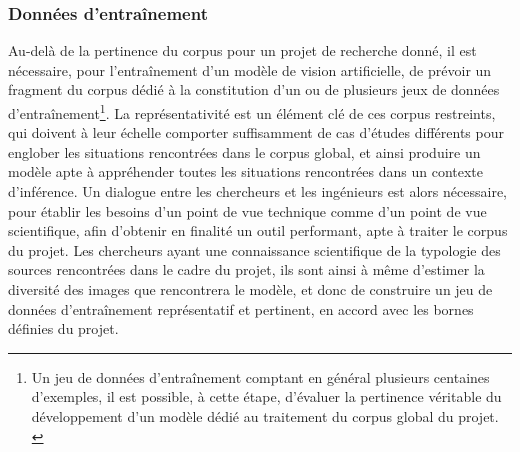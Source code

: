     \subsubsection{Données d'entraînement}
Au-delà de la pertinence du corpus pour un projet de recherche donné, il est nécessaire, pour l'entraînement d'un modèle de vision artificielle, de prévoir un fragment du corpus dédié à la constitution d'un ou de plusieurs jeux de données d'entraînement\footnote{Un jeu de données d'entraînement comptant en général plusieurs centaines d'exemples, il est possible, à cette étape, d'évaluer la pertinence véritable du développement d'un modèle dédié au traitement du corpus global du projet. \cite{strienComputerVisionHumanities2022}}. La représentativité est un élément clé de ces corpus restreints, qui doivent à leur échelle comporter suffisamment de cas d'études différents pour englober les situations rencontrées dans le corpus global, et ainsi produire un modèle apte à appréhender toutes les situations rencontrées dans un contexte d'inférence. Un dialogue entre les chercheurs et les ingénieurs est alors nécessaire, pour établir les besoins d'un point de vue technique comme d'un point de vue scientifique, afin d'obtenir en finalité un outil performant, apte à traiter le corpus du projet. Les chercheurs ayant une connaissance scientifique de la typologie des sources rencontrées dans le cadre du projet, ils sont ainsi à même d'estimer la diversité des images que rencontrera le modèle, et donc de construire un jeu de données d'entraînement représentatif et pertinent, en accord avec les bornes définies du projet.

